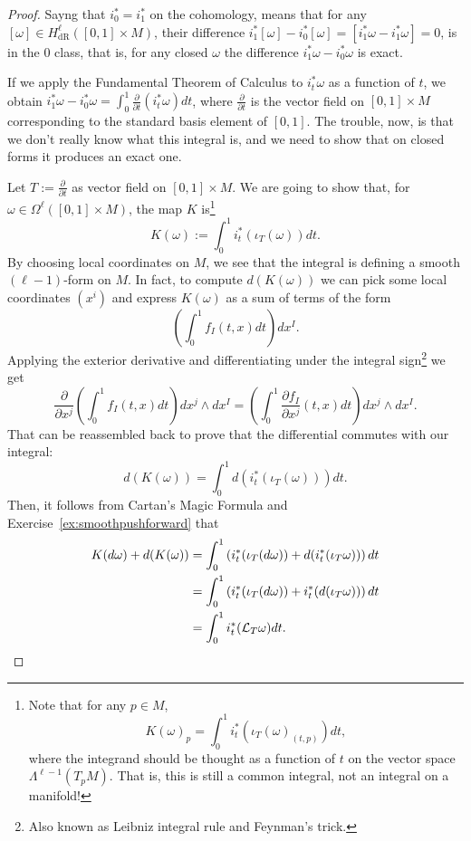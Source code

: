 \begin{proof}
  Sayng that  $i_0^* = i_1^*$ on the cohomology, means that for any $[\omega]\in H_{\mathrm{dR}}^\ell([0,1]\times M)$, their difference $i_1^*[\omega] - i_0^*[\omega] = [i_1^*\omega - i_1^*\omega] = 0$, is in the $0$ class, that is, for any closed $\omega$ the difference $i_1^*\omega - i_0^*\omega$ is exact.

  If we apply the Fundamental Theorem of Calculus to $i^*_t\omega$ as a function of $t$, we obtain $i_1^*\omega - i_0^*\omega = \int_0^1 \frac{\partial}{\partial t} (i^*_t \omega) dt$,
  where $\frac{\partial}{\partial t}$ is the vector field on $[0,1]\times M$ corresponding to the standard basis element of $[0,1]$.
  The trouble, now, is that we don't really know what this integral is, and we need to show that on closed forms it produces an exact one.

  Let $T:=\frac{\partial}{\partial t}$ as vector field on $[0,1]\times M$.
  We are going to show that, for $\omega\in\Omega^\ell([0,1]\times M)$, the map $K$ is\footnote{Note that for any $p\in M$,
  \begin{equation}
    K(\omega)_p = \int_0^1 i_t^*(\iota_T(\omega)_{(t,p)})dt,
  \end{equation}
  where the integrand should be thought as a function of $t$ on the vector space $\Lambda^{\ell-1}(T_pM)$.
  That is, this is still a common integral, not an integral on a manifold!}
  \begin{equation}
    K(\omega) := \int_0^1 i^*_t(\iota_T(\omega)) dt.
  \end{equation}
  By choosing local coordinates on $M$, we see that the integral is defining a smooth $(\ell-1)$-form on $M$.
  In fact, to compute $d(K(\omega))$ we can pick some local coordinates $(x^i)$ and express $K(\omega)$ as a sum of terms of the form
  \begin{equation}
    \left(\int_0^1 f_I(t,x) dt\right)dx^I.
  \end{equation}
  Applying the exterior derivative and differentiating under the integral sign\footnote{Also known as Leibniz integral rule and Feynman's trick.} we get
  \begin{equation}
    \frac{\partial}{\partial x^j}\left(\int_0^1 f_I(t,x) dt\right)dx^j\wedge dx^I = \left(\int_0^1 \frac{\partial f_I}{\partial x^j}(t,x) dt\right)dx^j\wedge dx^I.
  \end{equation}
  That can be reassembled back to prove that the differential commutes with our integral:
  \begin{equation}
    d(K(\omega)) = \int_0^1 d(i_t^*(\iota_T(\omega)))dt.
  \end{equation}
  Then, it follows from Cartan's Magic Formula and Exercise~\ref{ex:smoothpushforward} that
  \begin{align}
  K(d\omega) + d(K(\omega))
  &= \int_0^1\left( i_t^*(\iota_T(d\omega)) + d (i_t^*(\iota_T\omega)) \right) dt \\
  &= \int_0^1\left( i_t^*(\iota_T(d\omega)) + i_t^* (d(\iota_T\omega)) \right) dt \\ 
  &= \int_0^1 i_t^*(\mathcal{L}_T\omega) dt.
  \end{align}


\end{proof}
